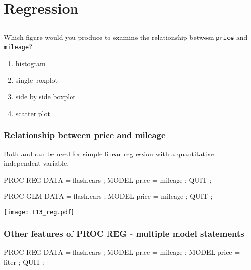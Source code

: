 \section[Regression]{Regression}
\subsection{}
\begin{frame}
\end{frame}

\begin{frame}
\begin{clicker}{Which figure would you produce to examine the relationship between \texttt{price} and \texttt{mileage}?}
\begin{enumerate}
\item histogram
\item single boxplot
\item side by side boxplot
\item scatter plot
\end{enumerate}
\end{clicker}
\end{frame}

\begin{frame}[fragile]
\frametitle{Relationship between price and mileage}
Both  and  can be used for simple linear regression with a quantitative independent variable.
\vskip5pt
\footnotesize
\begin{code}{.0}
PROC REG DATA = flash.cars ;
   MODEL price = mileage ;
QUIT ;

PROC GLM DATA = flash.cars ;
  MODEL price = mileage ;
QUIT ;
\end{code}
\emp
{} \hspace{1in} \emp
{}
\texttt{[image: L13\_reg.pdf]}
\emp
\end{frame}

\begin{frame}[fragile]
\frametitle{Other features of PROC REG - multiple model statements}
\footnotesize
\begin{code}{.0}
PROC REG DATA = flash.cars ;
   MODEL price = mileage ;
   MODEL price = liter ;
QUIT ;
\end{code}
\emp
\end{frame}

